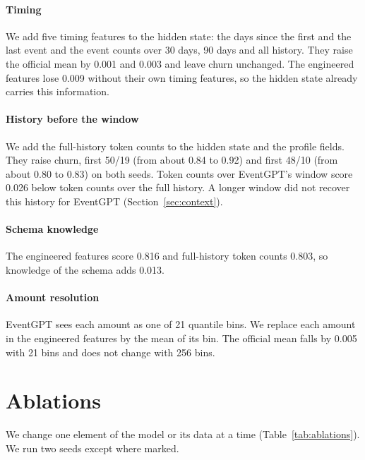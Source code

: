 \documentclass[12pt]{article}
\begin{document}
\paragraph{Timing} We add five timing features to the hidden state: the days since the first and the last event and the event counts over 30 days, 90 days and all history. They raise the official mean by 0.001 and 0.003 and leave churn unchanged. The engineered features lose 0.009 without their own timing features, so the hidden state already carries this information.

\paragraph{History before the window} We add the full-history token counts to the hidden state and the profile fields. They raise churn, first 50/19 (from about 0.84 to 0.92) and first 48/10 (from about 0.80 to 0.83) on both seeds. Token counts over EventGPT's window score 0.026 below token counts over the full history. A longer window did not recover this history for EventGPT (Section~\ref{sec:context}).

\paragraph{Schema knowledge} The engineered features score 0.816 and full-history token counts 0.803, so knowledge of the schema adds 0.013.

\paragraph{Amount resolution} EventGPT sees each amount as one of 21 quantile bins. We replace each amount in the engineered features by the mean of its bin. The official mean falls by 0.005 with 21 bins and does not change with 256 bins.

\section{Ablations}\label{sec:ablations}

We change one element of the model or its data at a time (Table~\ref{tab:ablations}). We run two seeds except where marked.
\end{document}
